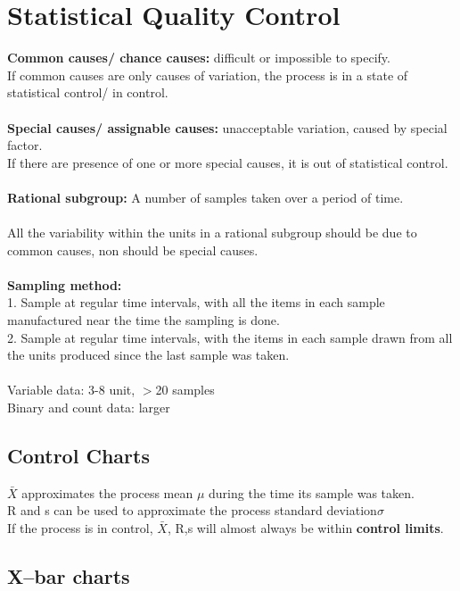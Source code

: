 \documentclass[../main.tex]{subfiles}
\begin{document}
\section{Statistical Quality Control}

\textbf{Common causes/ chance causes:} difficult or impossible to specify.\\
If common causes are only causes of variation, the process is in  a state of statistical control/ in control.\\\\
\textbf{Special causes/ assignable causes: }unacceptable variation, caused by special factor.\\
If there are presence of one or more special causes, it is out of statistical control.\\\\
\textbf{Rational subgroup:} A number of samples taken over a period of time.\\\\
All the variability within the units in a rational subgroup should be due to common causes, non should be special causes.\\\\
\textbf{Sampling method:}\\
    1. Sample at regular time intervals, with all the items in each sample manufactured near the time the sampling is done.\\
    2. Sample at regular time intervals, with the items in each sample drawn from all the units produced since the last sample was taken.\\\\
Variable data: 3-8 unit, $>$20 samples\\
Binary and count data: larger

\subsection{Control Charts}

$\bar X$ approximates the process mean $\mu$ during the time its sample was taken.\\
R and s can be used to approximate the process standard deviation$\sigma$\\
If the process is in control, $\bar X$, R,s will almost always be within \textbf{control limits}.\\

\subsection{X–bar charts}
\end{document}

